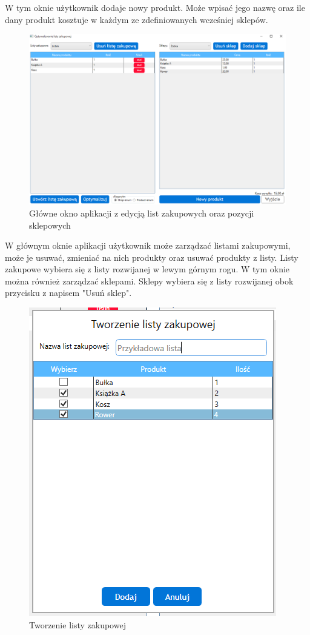\documentclass[a4paper]{article}
\begin{document}
\begin{flushleft}
W tym oknie użytkownik dodaje nowy produkt. Może wpisać jego nazwę oraz ile dany produkt kosztuje w każdym ze zdefiniowanych wcześniej sklepów.
\end{flushleft}
\begin{figure}[H]
\centering
\includegraphics[width=\textwidth,keepaspectratio]{img/main.png}
\caption{Główne okno aplikacji z edycją list zakupowych oraz pozycji sklepowych}
\end{figure}
\begin{flushleft}
W głównym oknie aplikacji użytkownik może zarządzać listami zakupowymi, może je usuwać, zmieniać na nich produkty oraz usuwać produkty z listy. Listy zakupowe wybiera się z listy rozwijanej w lewym górnym rogu. W tym oknie można również zarządzać sklepami. Sklepy wybiera się z listy rozwijanej obok przycisku z napisem "Usuń sklep".
\end{flushleft}
\begin{figure}[H]
\centering
\includegraphics[scale=1]{img/modal-nowa-lista.png}
\caption{Tworzenie listy zakupowej}
\end{figure}
\end{document}
